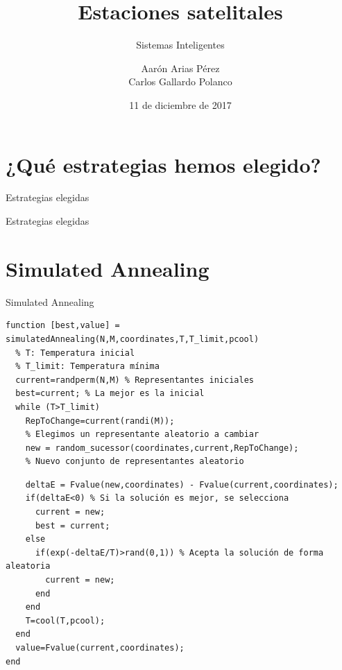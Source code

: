 \documentclass{beamer}
\title{Estaciones satelitales}
\subtitle{Sistemas Inteligentes}
\author{Aarón Arias Pérez \\ Carlos Gallardo Polanco}
\institute{Escuela Superior de Ingeniería\\Universidad de Cádiz}
\date{11 de diciembre de 2017}
\begin{document}
\frame{\titlepage}

\section{¿Qué estrategias hemos elegido?}
\begin{frame}{Estrategias elegidas}
  \begin{center}
  \end{center}
\end{frame}

\begin{frame}{Estrategias elegidas}
  \begin{center}
  \end{center}
\end{frame}

\section{Simulated Annealing}
\begin{frame}[fragile]{Simulated Annealing}
\begin{verbatim}
function [best,value] = simulatedAnnealing(N,M,coordinates,T,T_limit,pcool)
  % T: Temperatura inicial
  % T_limit: Temperatura mínima
  current=randperm(N,M) % Representantes iniciales
  best=current; % La mejor es la inicial
  while (T>T_limit)
    RepToChange=current(randi(M));
    % Elegimos un representante aleatorio a cambiar
    new = random_sucessor(coordinates,current,RepToChange);
    % Nuevo conjunto de representantes aleatorio
\end{verbatim}
\end{frame}

\begin{frame}[fragile]
\begin{verbatim}
    deltaE = Fvalue(new,coordinates) - Fvalue(current,coordinates);
    if(deltaE<0) % Si la solución es mejor, se selecciona
      current = new;
      best = current;
    else
      if(exp(-deltaE/T)>rand(0,1)) % Acepta la solución de forma aleatoria
        current = new;
      end
    end
    T=cool(T,pcool);
  end
  value=Fvalue(current,coordinates);
end
\end{verbatim}
\end{frame}
\end{document}

